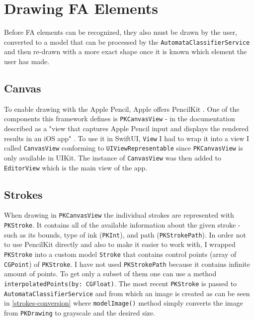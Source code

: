 \section{Drawing FA Elements}

Before FA elements can be recognized, they also must be drawn by the user, converted to a model that can be processed by the \lstinline{AutomataClassifierService} and then re-drawn with a more exact shape once it is known which element the user has made.

\subsection{Canvas}

To enable drawing with the Apple Pencil, Apple offers PencilKit \cite{pencilkit}. One of the components this framework defines is \lstinline{PKCanvasView} - in the documentation described as a "view that captures Apple Pencil input and displays the rendered results in an iOS app" \cite{pkcanvasview}. To use it in SwiftUI, \lstinline{View} I had to wrap it into a view I called \lstinline{CanvasView} conforming to \lstinline{UIViewRepresentable} since \lstinline{PKCanvasView} is only available in UIKit. The instance of \lstinline{CanvasView} was then added to \lstinline{EditorView} which is the main view of the app.

\subsection{Strokes}

When drawing in \lstinline{PKCanvasView} the individual strokes are represented with \lstinline{PKStroke}. It contains all of the available information about the given stroke - such as its bounds, type of ink (\lstinline{PKInt}), and path (\lstinline{PKStrokePath}). In order not to use PencilKit directly and also to make it easier to work with, I wrapped \lstinline{PKStroke} into a custom model \lstinline{Stroke} that contains control points (array of \lstinline{CGPoint}) of \lstinline{PKStroke}. I have not used \lstinline{PKStrokePath} because it contains infinite amount of points. To get only a subset of them one can use a method \lstinline{interpolatedPoints(by: CGFloat)}. The most recent \lstinline{PKStroke} is passed to \lstinline{AutomataClassifierService} and from which an image is created as can be seen in \ref{strokes-conversion} where \lstinline{modelImage()} method simply converts the image from \lstinline{PKDrawing} to grayscale and the desired size.

